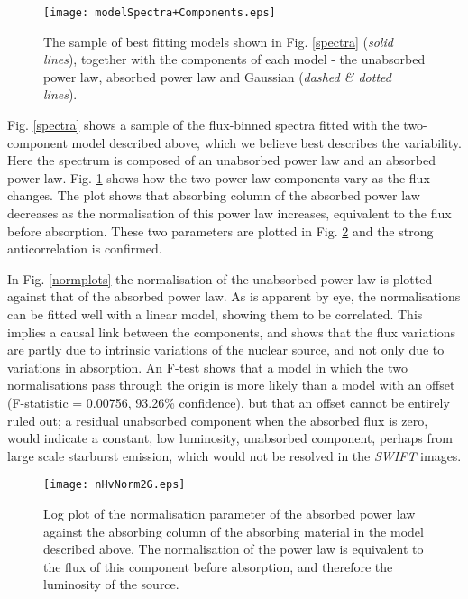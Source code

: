\documentclass[useAMS,usenatbib]{sam}
\begin{document}
 \begin{figure}
	\texttt{[image: modelSpectra+Components.eps]}
	\caption{The sample of best fitting models shown in Fig. \ref{spectra} ({\it solid lines}), together with the components of each model - the unabsorbed power
	law, absorbed power law and Gaussian ({\it dashed \& dotted lines}).}
	\label{modelSpectra}
\end{figure} 
 


Fig. \ref{spectra} shows a sample of the flux-binned spectra fitted with the two-component model described above, which we believe best describes the variability.  Here
the spectrum is composed of an unabsorbed power law and an absorbed power law. Fig. \ref{modelSpectra} shows how the two power law components vary as the flux changes.
The plot shows that absorbing column of the absorbed power law decreases as the normalisation of this power law increases, equivalent to the flux before absorption. These
two parameters are plotted in Fig. \ref{nhplots} and the strong anticorrelation is confirmed. 

In Fig. \ref{normplots} the normalisation of the unabsorbed power law is plotted against that of the absorbed power law. As is apparent by eye, the normalisations can be
fitted well with a linear model, showing them to be correlated. This implies a causal link between the components, and shows that the flux variations
are partly due to intrinsic variations of the nuclear source, and not only due to variations in absorption. An F-test shows that a model in which the two
normalisations pass through the origin is more likely than a model with an offset (F-statistic = 0.00756, 93.26\% confidence), but that an offset cannot be entirely ruled
out; a residual unabsorbed component when the absorbed flux is zero, would indicate a constant, low luminosity, unabsorbed component, perhaps from large scale starburst
emission, which would not be resolved in the {\it SWIFT} images.







\begin{figure}
	
	\texttt{[image: nHvNorm2G.eps]}\hspace{1pt}
	\caption{Log plot of the normalisation parameter of the absorbed power law 
		against the absorbing column of the absorbing material in
		the model described above. The normalisation of the power law is equivalent to the flux
		of this component before absorption, and therefore the luminosity of the source.}
	
	\label{nhplots}
\end{figure}  
		
\end{document}
